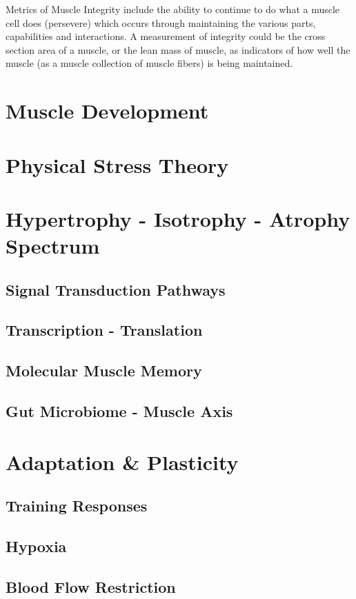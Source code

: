 Metrics of Muscle Integrity include the ability to continue to do what a muscle cell does (persevere) which occurs through maintaining the various parts, capabilities and interactions. A measurement of integrity could be the cross section area of a muscle, or the lean mass of muscle, as indicators of how well the muscle (as a muscle collection of muscle fibers) is being maintained.

\section{Muscle Development}

\section{Physical Stress Theory}

\section{Hypertrophy - Isotrophy - Atrophy Spectrum}


\subsection{Signal Transduction Pathways}

\subsection{Transcription - Translation}

\subsection{Molecular Muscle Memory}

\subsection{Gut Microbiome - Muscle Axis}

\section{Adaptation \& Plasticity}

\subsection{Training Responses}

\subsection{Hypoxia}

\subsection{Blood Flow Restriction}

\printbibliography[heading=subbibintoc]